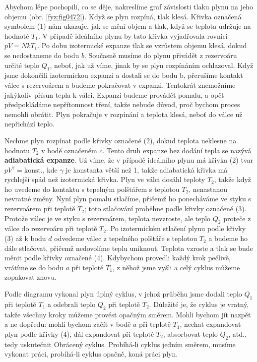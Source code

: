     Abychom lépe pochopili, co se děje, nakreslíme graf závislosti tlaku plynu na jeho objemu (obr.
    \ref{fyz:fig0472}). Když se plyn rozpíná, tlak klesá. Křivka označená symbolem (1) nám ukazuje,
    jak se mění objem a tlak, když se teplota udržuje na hodnotě \(T_1\). V případě ideálního plynu
    by tato křivka vyjadřovala rovnici \(pV= NkT_1\). Po dobu izotermické expanze tlak se vzrůstem
    objemu klesá, dokud se nedostaneme do bodu \(b\). Současně musíme do plynu přivádět z rezervoáru
    určité teplo \(Q_1\), neboť, jak už víme, jinak by se plyn rozpínáním ochlazoval. Když jsme
    dokončili izotermickou expanzi a dostali se do bodu b, přerušíme kontakt válce s rezervoárem a
    budeme pokračovat v expanzi. Tentokrát znemožníme jakýkoliv přísun tepla k válci. Expanzi budeme
    provádět pomalu, a opět předpokládáme nepřítomnost tření, takže nebude důvod, proč bychom proces
    nemohli obrátit. Plyn pokračuje v rozpínání a teplota klesá, neboť do válce už nepřichází teplo.

    Nechme plyn rozpínat podle křivky označené (2), dokud teplota neklesne na hodnotu \(T_2\) v bodě
    označeném \(c\). Tento druh expanze bez dodání tepla se nazývá \textbf{adiabatická expanze}. Už
    víme, že v případě ideálního plynu má křivka (2) tvar \(pV^\gamma =\text{konst.}\), kde
    \(\gamma\) je konstanta větší než 1, takže adiabatická křivka má rychlejší spád než izotermická
    křivka. Plyn ve válci dosáhl teploty \(T_2\), takže když ho uvedeme do kontaktu s tepelným
    polštářem s teplotou \(T_2\), nenastanou nevratné změny. Nyní plyn pomalu stlačíme, přičemž ho
    ponecháváme ve styku s rezervoárem při teplotě  \(T_2\); toto stlačování proběhne podle křivky
    označené (3). Protože válec je ve styku s rezervoárem, teplota nevzroste, ale teplo \(Q_2\)
    proteče z válce do rezervoáru při teplotě  \(T_2\). Po izotermickém stlačení plynu podle křivky
    (3) až k bodu \(d\) odvedeme válec z tepelného polštáře s teplotou  \(T_2\) a budeme ho dále
    stlačovat, přičemž nedovolíme teplu uniknout. Teplota vzroste a tlak se bude měnit podle křivky
    označené (4). Kdybychom provedli každý krok pečlivě, vrátíme se do bodu \(a\) při teplotě
    \(T_1\), z něhož jsme vyšli a celý cyklus můžeme zopakovat znovu.

    Podle diagramu vykonal plyn úplný cyklus, v jehož průběhu jsme dodali teplo \(Q_1\) při teplotě
    \(T_1\) a odebrali teplo \(Q_2\) při teplotě \(T_2\). Důležité je, že cyklus je vratný, takže
    všechny kroky můžeme provést opačným směrem. Mohli bychom jít nazpět a ne dopředu: mohli bychom
    začít v bodě \(a\) při teplotě \(T_1\), nechat expandovat plyn podle křivky (4), dál expandovat
    při teplotě \(T_2\), absorbovat teplo \(Q_2\), atd., tedy uskutečnit Obrácený cyklus. Probíhá-li
    cyklus jedním směrem, musíme vykonat práci, probíhá-li cyklus opačně, koná práci plyn.

